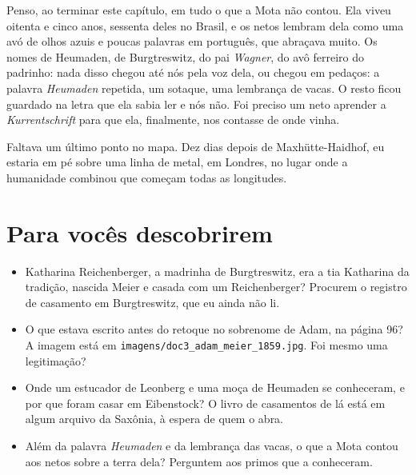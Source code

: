 \documentclass[
  brazilian,
  11pt,
  openany]{book}
\providecommand{\tightlist}{%
  \setlength{\itemsep}{0pt}\setlength{\parskip}{0pt}}
\begin{document}
Penso, ao terminar este capítulo, em tudo o que a Mota não contou. Ela
viveu oitenta e cinco anos, sessenta deles no Brasil, e os netos lembram
dela como uma avó de olhos azuis e poucas palavras em português, que
abraçava muito. Os nomes de Heumaden, de Burgtreswitz, do pai
\emph{Wagner}, do avô ferreiro do padrinho: nada disso chegou até nós
pela voz dela, ou chegou em pedaços: a palavra \emph{Heumaden} repetida,
um sotaque, uma lembrança de vacas. O resto ficou guardado na letra que
ela sabia ler e nós não. Foi preciso um neto aprender a
\emph{Kurrentschrift} para que ela, finalmente, nos contasse de onde
vinha.

Faltava um último ponto no mapa. Dez dias depois de Maxhütte-Haidhof, eu
estaria em pé sobre uma linha de metal, em Londres, no lugar onde a
humanidade combinou que começam todas as longitudes.

\section{Para vocês descobrirem}\label{para-vocuxeas-descobrirem-17}

\begin{itemize}
\tightlist
\item
  Katharina Reichenberger, a madrinha de Burgtreswitz, era a tia
  Katharina da tradição, nascida Meier e casada com um Reichenberger?
  Procurem o registro de casamento em Burgtreswitz, que eu ainda não li.
\item
  O que estava escrito antes do retoque no sobrenome de Adam, na página
  96? A imagem está em \texttt{imagens/doc3\_adam\_meier\_1859.jpg}. Foi
  mesmo uma legitimação?
\item
  Onde um estucador de Leonberg e uma moça de Heumaden se conheceram, e
  por que foram casar em Eibenstock? O livro de casamentos de lá está em
  algum arquivo da Saxônia, à espera de quem o abra.
\item
  Além da palavra \emph{Heumaden} e da lembrança das vacas, o que a Mota
  contou aos netos sobre a terra dela? Perguntem aos primos que a
  conheceram.
\end{itemize}
\end{document}

